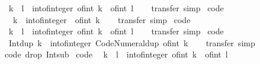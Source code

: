 \begin{isabellebody}
\ \ {\isachardoublequoteopen}k\ {\isacharplus}\ l\ {\isacharequal}\ int{\isacharunderscore}of{\isacharunderscore}integer\ {\isacharparenleft}of{\isacharunderscore}int\ k\ {\isacharplus}\ of{\isacharunderscore}int\ l{\isacharparenright}{\isachardoublequoteclose}\isanewline
%
\isadelimproof
\ \ %
\endisadelimproof
%
\isatagproof
{}\isamarkupfalse%
\ transfer\ simp%
\endisatagproof
{\isafoldproof}%
%
\isadelimproof
\isanewline
%
\endisadelimproof
\isanewline
{}\isamarkupfalse%
\ {\isacharbrackleft}code{\isacharbrackright}{\isacharcolon}\isanewline
\ \ {\isachardoublequoteopen}{\isacharminus}\ k\ {\isacharequal}\ int{\isacharunderscore}of{\isacharunderscore}integer\ {\isacharparenleft}{\isacharminus}\ of{\isacharunderscore}int\ k{\isacharparenright}{\isachardoublequoteclose}\isanewline
%
\isadelimproof
\ \ %
\endisadelimproof
%
\isatagproof
{}\isamarkupfalse%
\ transfer\ simp%
\endisatagproof
{\isafoldproof}%
%
\isadelimproof
\isanewline
%
\endisadelimproof
\isanewline
{}\isamarkupfalse%
\ {\isacharbrackleft}code{\isacharbrackright}{\isacharcolon}\isanewline
\ \ {\isachardoublequoteopen}k\ {\isacharminus}\ l\ {\isacharequal}\ int{\isacharunderscore}of{\isacharunderscore}integer\ {\isacharparenleft}of{\isacharunderscore}int\ k\ {\isacharminus}\ of{\isacharunderscore}int\ l{\isacharparenright}{\isachardoublequoteclose}\isanewline
%
\isadelimproof
\ \ %
\endisadelimproof
%
\isatagproof
{}\isamarkupfalse%
\ transfer\ simp%
\endisatagproof
{\isafoldproof}%
%
\isadelimproof
\isanewline
%
\endisadelimproof
\isanewline
{}\isamarkupfalse%
\ {\isacharbrackleft}code{\isacharbrackright}{\isacharcolon}\isanewline
\ \ {\isachardoublequoteopen}Int{\isachardot}dup\ k\ {\isacharequal}\ int{\isacharunderscore}of{\isacharunderscore}integer\ {\isacharparenleft}Code{\isacharunderscore}Numeral{\isachardot}dup\ {\isacharparenleft}of{\isacharunderscore}int\ k{\isacharparenright}{\isacharparenright}{\isachardoublequoteclose}\isanewline
%
\isadelimproof
\ \ %
\endisadelimproof
%
\isatagproof
{}\isamarkupfalse%
\ transfer\ simp%
\endisatagproof
{\isafoldproof}%
%
\isadelimproof
\isanewline
%
\endisadelimproof
\isanewline
{}\isamarkupfalse%
\ {\isacharbrackleft}{\isacharbrackleft}code\ drop{\isacharcolon}\ Int{\isachardot}sub{\isacharbrackright}{\isacharbrackright}\isanewline
\isanewline
{}\isamarkupfalse%
\ {\isacharbrackleft}code{\isacharbrackright}{\isacharcolon}\isanewline
\ \ {\isachardoublequoteopen}k\ {\isacharasterisk}\ l\ {\isacharequal}\ int{\isacharunderscore}of{\isacharunderscore}integer\ {\isacharparenleft}of{\isacharunderscore}int\ k\ {\isacharasterisk}\ of{\isacharunderscore}int\ l{\isacharparenright}{\isachardoublequoteclose}\isanewline

\end{isabellebody}
